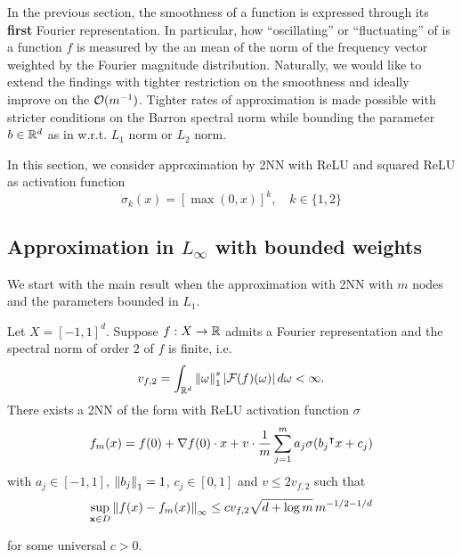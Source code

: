 
In the previous section, the smoothness of a function is expressed through its
\textbf{first} Fourier representation. In particular, how ``oscillating'' or
``fluctuating'' of is a function $f$ is measured by the an mean of the norm of
the frequency vector weighted by the Fourier magnitude distribution. Naturally,
we would like to extend the findings with tighter restriction on the smoothness
and ideally improve on the $\mathcal{O}(m^{-1})$. Tighter rates of approximation is
made possible with stricter conditions on the Barron spectral norm while
bounding the parameter $b\in\mathbb{R}^d$ as in \TOCITE w.r.t. $L_1$ norm or $L_2$ norm. 


In this section, we consider approximation by 2NN with ReLU and squared ReLU as
activation function
\begin{equation}
    \sigma_k(x) = [\max(0, x)]^k, \quad k \in \{1, 2\}
\end{equation}

\subsection{Approximation in $L_{\infty}$ with bounded weights}

We start with the main result when the approximation with 2NN with $m$ nodes and 
the parameters bounded in $L_1$.

\begin{theorem}
    \label{thm:appro_bound_l1}
    Let $X = [-1,1]^d$. Suppose $f: X \to \mathbb{R}$ admits a Fourier representation
    and the spectral norm of order $2$ of $f$ is finite, i.e.
    \begin{equation}
        v_{f,2} = \int_{\mathbb{R}^d} \left\| \omega \right\|_1^s \left| \mathcal{F}(f)(\omega) \right| 
        d\omega < \infty.
    \end{equation}
    There exists a 2NN of the form with ReLU activation function $\sigma$
    \begin{equation}
        f_m(x) = f(0) + \nabla f(0) \cdot x + v \cdot 
        \frac{1}{m} \sum_{j=1}^m a_j \sigma(b_j{}^{\intercal} x + c_j)
    \end{equation}
    with $a_j\in[-1,1]$, $\left\| b_j \right\|_1 = 1$, $c_j\in[0,1]$ and $v \leq
    2v_{f,2}$ such that
    \begin{equation}
        \sup_{\mathbf{x} \in D} \left\| f(x) - f_m(x) \right\|_{\infty} \leq c v_{f,2} \sqrt{d+\log{m}} \, m^{-1/2-1/d}
    \end{equation}

    for some universal $c > 0$.
\end{theorem}

